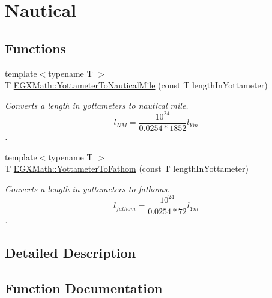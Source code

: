 \hypertarget{group___e_g_x_math-_conversions-_length_conversions-_s_i-_yottameter-_nautical}{}\section{Nautical}
\label{group___e_g_x_math-_conversions-_length_conversions-_s_i-_yottameter-_nautical}
\subsection*{Functions}
\begin{DoxyCompactItemize}
\item 
{\footnotesize template$<$typename T $>$ }\\T \mbox{\hyperlink{group___e_g_x_math-_conversions-_length_conversions-_s_i-_yottameter-_nautical_ga455b7f16dd9ff68f759f366def111300}{E\+G\+X\+Math\+::\+Yottameter\+To\+Nautical\+Mile}} (const T length\+In\+Yottameter)
\begin{DoxyCompactList}\small\item\em Converts a length in yottameters to nautical mile. \[ l_{NM}= \frac{10^{24}}{0.0254 * 1852} l_{Ym} \]. \end{DoxyCompactList}\item 
{\footnotesize template$<$typename T $>$ }\\T \mbox{\hyperlink{group___e_g_x_math-_conversions-_length_conversions-_s_i-_yottameter-_nautical_ga602afc490045a91db8931798e6ee4bbd}{E\+G\+X\+Math\+::\+Yottameter\+To\+Fathom}} (const T length\+In\+Yottameter)
\begin{DoxyCompactList}\small\item\em Converts a length in yottameters to fathoms. \[ l_{fathom}= \frac{10^{24}}{0.0254 * 72} l_{Ym} \]. \end{DoxyCompactList}\end{DoxyCompactItemize}


\subsection{Detailed Description}


\subsection{Function Documentation}
\mbox{\label{group___e_g_x_math-_conversions-_length_conversions-_s_i-_yottameter-_nautical_ga602afc490045a91db8931798e6ee4bbd}} 
